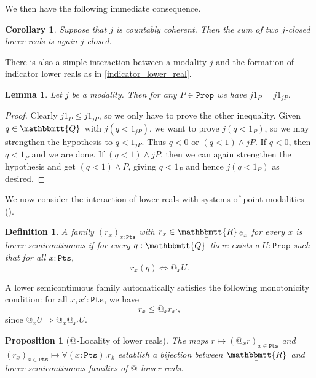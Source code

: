 \documentclass[reqno,11pt]{amsproc}
\makeatletter
\theoremstyle{plain}
\newtheorem{proposition}[theorem]{Proposition}
\newtheorem{corollary}[theorem]{Corollary}
\newtheorem{lemma}[theorem]{Lemma}
\newtheorem{definition}[theorem]{Definition}
\theoremstyle{definition}
\newcommand{\Const}[1]{\mathtt{#1}}
\newcommand{\ubar}[1]{\underaccent{\bar}{#1}}
\newcommand{\ind}[1]{1_{#1}}			%
\newcommand{\internal}[1]{\raisebox{-.03ex}{$\mathbbmtt{#1}$}}
\newcommand{\hs}{\hspace{1pt}}
\newcommand{\tqq}{\internal{Q}\hs}
\newcommand{\trr}{\internal{R}}
\newcommand{\tlrr}{\ubar{\trr}\hs}
\newcommand{\prop}{\Const{Prop}}
\newcommand{\pt}{x}
\newcommand{\pts}{\mathtt{Pts}}		%
\newcommand{\atsymbol}{{@}}
\newcommand{\at}[1][\pt]{\atsymbol_{#1}}
\newcommand{\imp}{\Rightarrow}
\numberwithin{equation}{section}
\makeatother
\begin{document}
We then have the following immediate consequence.

\begin{corollary}
	\label{closed_sum}
	Suppose that $j$ is countably coherent. Then the sum of two $j$-closed lower reals is again $j$-closed.
\end{corollary}

There is also a simple interaction between a modality $j$ and the formation of indicator lower reals as in \eqref{indicator_lower_real}.

\begin{lemma}
	\label{lemma.j_indicator}
	Let $j$ be a modality. Then for any $P \in \prop$ we have $j\ind{P}=j\ind{jP}$.
\end{lemma}

\begin{proof}
	Clearly $j\ind{P}\le j\ind{jP}$, so we only have to prove the other inequality. Given $q \in \tqq$ with $j(q < \ind{jP})$, we want to prove $j(q<\ind{P})$, so we may strengthen the hypothesis to $q < \ind{jP}$. Thus $q < 0$ or $(q < 1) \land jP$. If $q < 0$, then $q < \ind{P}$ and we are done. If $(q < 1) \land jP$, then we can again strengthen the hypothesis and get $(q<1)\wedge P$, giving $q<\ind{P}$ and hence $j(q<\ind{P})$ as desired.
\end{proof}

We now consider the interaction of lower reals with systems of point modalities ().

\begin{definition}
	A family $(r_\pt)_{\pt : \pts}$ with $r_\pt \in \tlrr_{\at}$ for every $\pt$ is \emph{lower semicontinuous} if for every $q:\tqq$ there exists a $U:\prop$ such that for all $\pt : \pts$,
	\begin{equation}\label{eqn.witness}
		r_\pt(q) \Leftrightarrow \at U.
	\end{equation}
\end{definition}

A lower semicontinuous family automatically satisfies the following monotonicity condition: for all $\pt,\pt' : \pts$, we have
\begin{equation}
	\label{r_pt_monotone}
	r_\pt \le \at r_{\pt'},
\end{equation}
since $\at U \imp \at \at[\pt'] U$.

\begin{proposition}[{$\at[]$-Locality of lower reals}]
	\label{prop:LR_locality}
	The maps $r \mapsto (\at r)_{\pt\in\pts}$ and $(r_\pt)_{\pt\in\pts}\mapsto \forall(\pt:\pts).r_k$ establish a bijection between $\tlrr$ and lower semicontinuous families of $\at[]$-lower reals.
\end{proposition}
\end{document}
